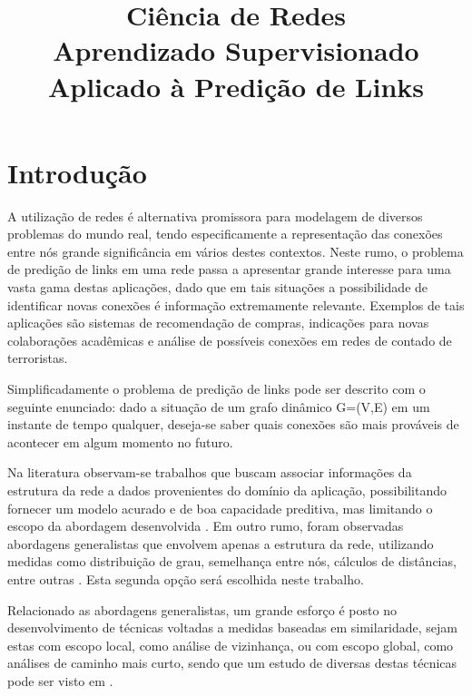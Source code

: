 \documentclass[a4paper,11pt]{article}
\title{\Large{Ciência de Redes} \\ \Large{Aprendizado Supervisionado Aplicado à Predição de Links}}
\begin{document}
\maketitle


\author{
}

\vspace{1.0cm}

\section{Introdução}

\vspace{0.5cm}

A utilização de redes é alternativa promissora para modelagem de diversos problemas do mundo real, tendo especificamente a representação das conexões entre nós grande significância em vários destes contextos. Neste rumo, o problema de predição de links em uma rede passa a apresentar grande interesse para uma vasta gama destas aplicações, dado que em tais situações a possibilidade de identificar novas conexões é informação extremamente relevante. Exemplos de tais aplicações são sistemas de recomendação de compras, indicações para novas colaborações acadêmicas e análise de possíveis conexões em redes de contado de terroristas.

Simplificadamente o problema de predição de links pode ser descrito com o seguinte enunciado: dado a situação de um grafo dinâmico G=(V,E) em um instante de tempo qualquer, deseja-se saber quais conexões são mais prováveis de acontecer em algum momento no futuro.%

Na literatura observam-se trabalhos que buscam associar informações da estrutura da rede a dados provenientes do domínio da aplicação, possibilitando fornecer um modelo  acurado e de boa capacidade preditiva, mas limitando o escopo da abordagem desenvolvida \cite{Mohammad06, Sa11}. Em outro rumo, foram observadas abordagens generalistas que envolvem apenas a estrutura da rede, utilizando medidas como distribuição de grau, semelhança entre nós, cálculos de distâncias, entre outras \cite{Cukierski11}. Esta segunda opção será escolhida neste trabalho.

Relacionado as abordagens generalistas, um grande esforço é posto no desenvolvimento de técnicas voltadas a medidas baseadas em similaridade, sejam estas com escopo local, como análise de vizinhança, ou com escopo global, como análises de caminho mais curto, sendo que um estudo de diversas destas técnicas pode ser visto em \cite{Martinez16}.
\end{document}
